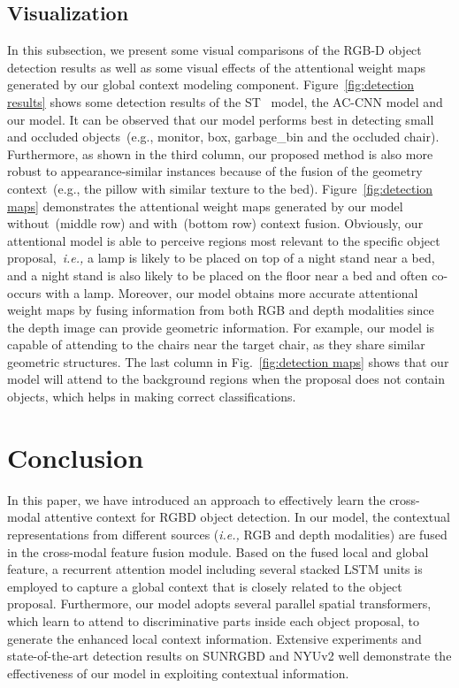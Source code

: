 \documentclass[journal]{IEEEtran}
\begin{document}
\subsection{Visualization} 
\label{sec:visualization}
In this subsection, we present some visual comparisons of the RGB-D object detection results as well as some visual effects of the attentional weight maps generated by our global context modeling component. Figure~\ref{fig:detection results} shows some detection results of the ST~\cite{gupta2016cross} model, the AC-CNN \cite{li2016attentive} model and our model. It can be observed that our model performs best in detecting small and occluded objects~(e.g., monitor, box, garbage\_bin and the occluded chair). Furthermore, as shown in the third column, our proposed method is also more robust to appearance-similar instances because of the fusion of the geometry context~(e.g., the pillow with similar texture to the bed). Figure~\ref{fig:detection maps} demonstrates the attentional weight maps generated by our model without~(middle row) and with~(bottom row) context fusion. Obviously, our attentional model is able to perceive regions most relevant to the specific object proposal,~\textit{i.e.,} a lamp is likely to be placed on top of a night stand near a bed, and a night stand is also likely to be placed on the floor near a bed and often co-occurs with a lamp. Moreover, our model obtains more accurate attentional weight maps by fusing information from both RGB and depth modalities since the depth image can provide geometric information. For example, our model is capable of attending to the chairs near the target chair, as they share similar geometric structures. The last column in Fig.~\ref{fig:detection maps} shows that our model will attend to the background regions when the proposal does not contain objects, which helps in making correct classifications.


\section{Conclusion}
In this paper, we have introduced an approach to effectively learn the cross-modal attentive context for RGBD object detection. In our model, the contextual representations from different sources (\textit{i.e.,} RGB and depth modalities) are fused in the cross-modal feature fusion module. Based on the fused local and global feature, a recurrent attention model including several stacked LSTM units is employed to capture a global context that is closely related to the object proposal. Furthermore, our model adopts several parallel spatial transformers, which learn to attend to discriminative parts inside each object proposal, to generate the enhanced local context information. Extensive experiments and state-of-the-art detection results on SUNRGBD and NYUv2 well demonstrate the effectiveness of our model in exploiting contextual information.










\ifCLASSOPTIONcaptionsoff
  \newpage
\fi






{\small


}
\end{document}

